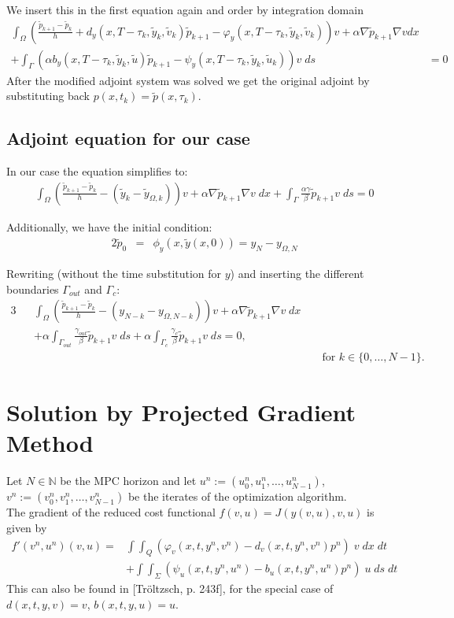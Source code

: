 \documentclass[
12pt, %
a4paper, %
onecolumn, %
portrait %
]{article}
\begin{document}
We insert this in the first equation again and order by integration domain
\begin{align*}
\int_{\Omega} (\frac{\tilde{p}_{k+1} - \tilde{p}_k}{h} + d_y(x,T - \tau_{k}, \tilde{y}_k, \tilde{v}_k) \tilde{p}_{k+1} - \varphi_y(x,T - \tau_k,\tilde{y}_k, \tilde{v}_k)) v + \alpha \nabla \tilde{p}_{k+1} \nabla v dx & \\
+ \int_{\Gamma} (\alpha b_y(x,T-\tau_k, \tilde{y}_k, \tilde{u}) \tilde{p}_{k+1} - \psi_y(x,T-\tau_k, \tilde{y}_k, \tilde{u}_k) ) v \; ds  & = 0
\end{align*}
After the modified adjoint system was solved we get the original adjoint by substituting back $p(x,t_k) = \tilde{p}(x,\tau_k)$.

\subsection{Adjoint equation for our case}
In our case the equation simplifies to:
\begin{align*}
\int_{\Omega} (\frac{\tilde{p}_{k+1} - \tilde{p}_k}{h} - (\tilde{y}_k - \tilde{y}_{\Omega,k})) v + \alpha \nabla \tilde{p}_{k+1} \nabla v \; dx 
+ \int_{\Gamma} \frac{\alpha \gamma}{\beta} \tilde{p}_{k+1} v \; ds  = 0
\end{align*}

Additionally, we have the initial condition:
\begin{alignat*}{2}
\tilde{p}_{0} &= &\phi_y(x, \tilde{y}(x,0)) = y_{N} - y_{\Omega, N}
\end{alignat*}

Rewriting (without the time substitution for $y$) and inserting the different boundaries $\Gamma_{out}$ and $\Gamma_c$:
\begin{alignat*}{3}
&&\int_{\Omega} (\frac{\tilde{p}_{k+1} - \tilde{p}_k}{h} - (y_{N-k} - y_{\Omega,N-k})) v + \alpha \nabla \tilde{p}_{k+1} \nabla v \; dx && \\
&&+ \alpha \int_{\Gamma_{out}} \frac{\gamma_{out}}{\beta} \tilde{p}_{k+1} v \; ds + \alpha \int_{\Gamma_{c}} \frac{\gamma_{c}}{\beta} \tilde{p}_{k+1} v \; ds  = 0, && \\
&& && \text{ for } k \in \{0, \hdots, N-1\}.
\end{alignat*}

\section{Solution by Projected Gradient Method}
Let $N \in \mathbb{N}$ be the MPC horizon and let $u^n := (u_0^n, u_1^n, \hdots, u_{N-1}^n)$, $v^n := (v_0^n, v_1^n, \hdots, v_{N-1}^n)$ be the iterates of the optimization algorithm. \\ 
The gradient of the reduced cost functional $f(v,u) = J(y(v,u), v, u)$ is given by
\begin{align*}
f'(v^n, u^n)(v,u) = & \int \int_Q (\varphi_v(x,t, y^n, v^n) - d_v(x,t,y^n,v^n) p^n) \; v \; dx \; dt \\
& + \int \int_{\Sigma} (\psi_u(x,t,y^n, u^n) - b_u(x,t,y^n,u^n) p^n) \; u \; ds \; dt
\end{align*}
This can also be found in [Tr\"oltzsch, p. 243f], for the special case of $d(x,t,y,v) = v$, $b(x,t,y,u) = u$.
\end{document}
